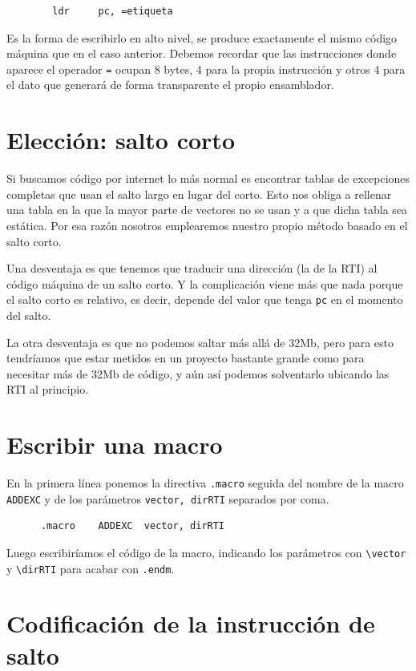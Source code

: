 \begin{lstlisting}
        ldr     pc, =etiqueta
\end{lstlisting}

Es la forma de escribirlo en alto nivel, se produce exactamente el mismo código
máquina que en el caso anterior. Debemos recordar que las instrucciones donde
aparece el operador {\tt =} ocupan 8 bytes, 4 para la propia instrucción y otros
4 para el dato que generará de forma transparente el propio ensamblador.

\section{Elección: salto corto}

Si buscamos código por internet lo más normal es encontrar tablas de excepciones
completas que usan el salto largo en lugar del corto. Esto nos obliga a
rellenar una tabla en la que la mayor parte de vectores no se usan y a que
dicha tabla sea estática. Por esa razón nosotros emplearemos nuestro propio
método basado en el salto corto.

Una desventaja es que tenemos que traducir una dirección (la de la RTI) al
código máquina de un salto corto. Y la complicación viene más que nada porque
el salto corto es relativo, es decir, depende del valor que tenga {\tt pc} en
el momento del salto.

La otra desventaja es que no podemos saltar más allá de 32Mb, pero para esto tendríamos
que estar metidos en un proyecto bastante grande como para necesitar más de 32Mb
de código, y aún así podemos solventarlo ubicando las RTI al principio.

\section{Escribir una macro}

En la primera línea ponemos la directiva {\tt .macro} seguida del nombre de la macro
{\tt ADDEXC} y de los parámetros {\tt vector, dirRTI} separados por coma.

\begin{lstlisting}
      .macro    ADDEXC  vector, dirRTI
\end{lstlisting}

Luego escribiríamos el código de la macro, indicando los parámetros con
{\tt \textbackslash vector} y {\tt \textbackslash dirRTI} para acabar con {\tt .endm}.

\section{Codificación de la instrucción de salto}

